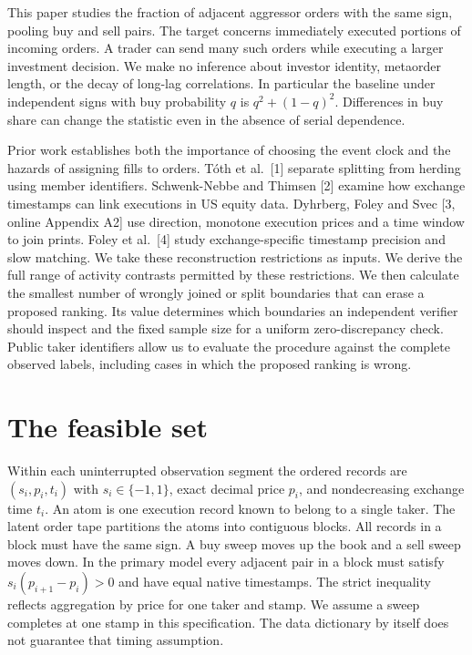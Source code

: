 \documentclass[11pt]{article}
\begin{document}
This paper studies the fraction of adjacent aggressor orders with the same sign, pooling buy and sell pairs. The target concerns immediately executed portions of incoming orders. A trader can send many such orders while executing a larger investment decision. We make no inference about investor identity, metaorder length, or the decay of long-lag correlations. In particular the baseline under independent signs with buy probability $q$ is $q^2+(1-q)^2$. Differences in buy share can change the statistic even in the absence of serial dependence.

Prior work establishes both the importance of choosing the event clock and the hazards of assigning fills to orders. T\'oth et al.\ [1] separate splitting from herding using member identifiers. Schwenk-Nebbe and Thimsen [2] examine how exchange timestamps can link executions in US equity data. Dyhrberg, Foley and Svec [3, online Appendix A2] use direction, monotone execution prices and a time window to join prints. Foley et al.\ [4] study exchange-specific timestamp precision and slow matching. We take these reconstruction restrictions as inputs. We derive the full range of activity contrasts permitted by these restrictions. We then calculate the smallest number of wrongly joined or split boundaries that can erase a proposed ranking. Its value determines which boundaries an independent verifier should inspect and the fixed sample size for a uniform zero-discrepancy check. Public taker identifiers allow us to evaluate the procedure against the complete observed labels, including cases in which the proposed ranking is wrong.

\section{The feasible set}
Within each uninterrupted observation segment the ordered records are $(s_i,p_i,t_i)$ with $s_i\in\{-1,1\}$, exact decimal price $p_i$, and nondecreasing exchange time $t_i$. An atom is one execution record known to belong to a single taker. The latent order tape partitions the atoms into contiguous blocks. All records in a block must have the same sign. A buy sweep moves up the book and a sell sweep moves down. In the primary model every adjacent pair in a block must satisfy $s_i(p_{i+1}-p_i)>0$ and have equal native timestamps. The strict inequality reflects aggregation by price for one taker and stamp. We assume a sweep completes at one stamp in this specification. The data dictionary by itself does not guarantee that timing assumption.
\end{document}
